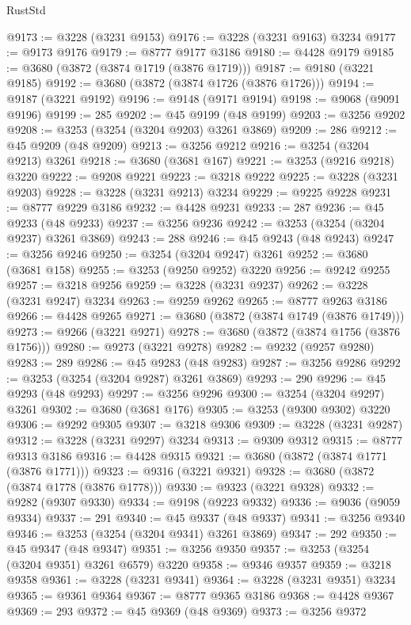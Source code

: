 \begin{lexlean}{RustStd}
\begin{coremodule}
@9173 := @3228 (@3231 @9153)
@9176 := @3228 (@3231 @9163) @3234
@9177 := @9173 @9176
@9179 := @8777 @9177 @3186
@9180 := @4428 @9179
@9185 := @3680 (@3872 (@3874 @1719 (@3876 @1719)))
@9187 := @9180 (@3221 @9185)
@9192 := @3680 (@3872 (@3874 @1726 (@3876 @1726)))
@9194 := @9187 (@3221 @9192)
@9196 := @9148 (@9171 @9194)
@9198 := @9068 (@9091 @9196)
@9199 := 285
@9202 := @45 @9199 (@48 @9199)
@9203 := @3256 @9202
@9208 := @3253 (@3254 (@3204 @9203) @3261 @3869)
@9209 := 286
@9212 := @45 @9209 (@48 @9209)
@9213 := @3256 @9212
@9216 := @3254 (@3204 @9213) @3261
@9218 := @3680 (@3681 @167)
@9221 := @3253 (@9216 @9218) @3220
@9222 := @9208 @9221
@9223 := @3218 @9222
@9225 := @3228 (@3231 @9203)
@9228 := @3228 (@3231 @9213) @3234
@9229 := @9225 @9228
@9231 := @8777 @9229 @3186
@9232 := @4428 @9231
@9233 := 287
@9236 := @45 @9233 (@48 @9233)
@9237 := @3256 @9236
@9242 := @3253 (@3254 (@3204 @9237) @3261 @3869)
@9243 := 288
@9246 := @45 @9243 (@48 @9243)
@9247 := @3256 @9246
@9250 := @3254 (@3204 @9247) @3261
@9252 := @3680 (@3681 @158)
@9255 := @3253 (@9250 @9252) @3220
@9256 := @9242 @9255
@9257 := @3218 @9256
@9259 := @3228 (@3231 @9237)
@9262 := @3228 (@3231 @9247) @3234
@9263 := @9259 @9262
@9265 := @8777 @9263 @3186
@9266 := @4428 @9265
@9271 := @3680 (@3872 (@3874 @1749 (@3876 @1749)))
@9273 := @9266 (@3221 @9271)
@9278 := @3680 (@3872 (@3874 @1756 (@3876 @1756)))
@9280 := @9273 (@3221 @9278)
@9282 := @9232 (@9257 @9280)
@9283 := 289
@9286 := @45 @9283 (@48 @9283)
@9287 := @3256 @9286
@9292 := @3253 (@3254 (@3204 @9287) @3261 @3869)
@9293 := 290
@9296 := @45 @9293 (@48 @9293)
@9297 := @3256 @9296
@9300 := @3254 (@3204 @9297) @3261
@9302 := @3680 (@3681 @176)
@9305 := @3253 (@9300 @9302) @3220
@9306 := @9292 @9305
@9307 := @3218 @9306
@9309 := @3228 (@3231 @9287)
@9312 := @3228 (@3231 @9297) @3234
@9313 := @9309 @9312
@9315 := @8777 @9313 @3186
@9316 := @4428 @9315
@9321 := @3680 (@3872 (@3874 @1771 (@3876 @1771)))
@9323 := @9316 (@3221 @9321)
@9328 := @3680 (@3872 (@3874 @1778 (@3876 @1778)))
@9330 := @9323 (@3221 @9328)
@9332 := @9282 (@9307 @9330)
@9334 := @9198 (@9223 @9332)
@9336 := @9036 (@9059 @9334)
@9337 := 291
@9340 := @45 @9337 (@48 @9337)
@9341 := @3256 @9340
@9346 := @3253 (@3254 (@3204 @9341) @3261 @3869)
@9347 := 292
@9350 := @45 @9347 (@48 @9347)
@9351 := @3256 @9350
@9357 := @3253 (@3254 (@3204 @9351) @3261 @6579) @3220
@9358 := @9346 @9357
@9359 := @3218 @9358
@9361 := @3228 (@3231 @9341)
@9364 := @3228 (@3231 @9351) @3234
@9365 := @9361 @9364
@9367 := @8777 @9365 @3186
@9368 := @4428 @9367
@9369 := 293
@9372 := @45 @9369 (@48 @9369)
@9373 := @3256 @9372

\end{coremodule}
\end{lexlean}
